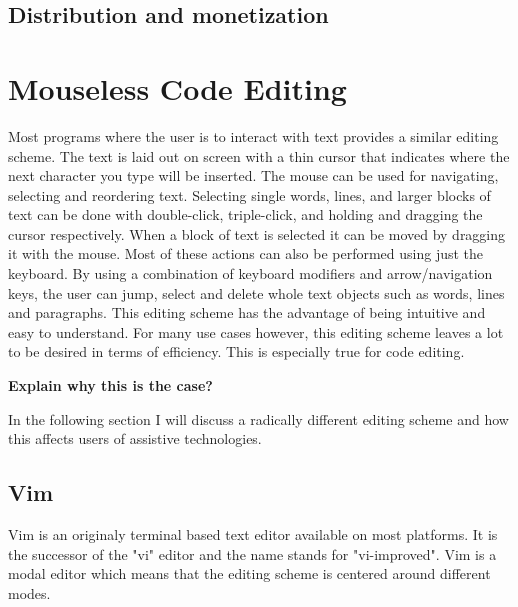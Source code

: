 \documentclass[a4paper,english]{ifimaster}
\begin{document}
\subsection{Distribution and monetization}

\newpage
\section{Mouseless Code Editing}
Most programs where the user is to interact with text provides a similar editing scheme.
The text is laid out on screen with a thin cursor that indicates where the next character you type will be inserted.
The mouse can be used for navigating, selecting and reordering text.
Selecting single words, lines, and larger blocks of text can be done with double-click, triple-click, and holding and dragging the cursor respectively.
When a block of text is selected it can be moved by dragging it with the mouse.
Most of these actions can also be performed using just the keyboard.
By using a combination of keyboard modifiers and arrow/navigation keys, the user can jump, select and delete whole text objects such as words, lines and paragraphs.
This editing scheme has the advantage of being intuitive and easy to understand.
For many use cases however, this editing scheme leaves a lot to be desired in terms of efficiency.
This is especially true for code editing.

\textbf{Explain why this is the case?}

In the following section I will discuss a radically different editing scheme and how this affects users of assistive technologies.

\subsection{Vim}
Vim is an originaly terminal based text editor available on most platforms.
It is the successor of the "vi" editor and the name stands for "vi-improved".
Vim is a modal editor which means that the editing scheme is centered around different modes.







\end{document}
